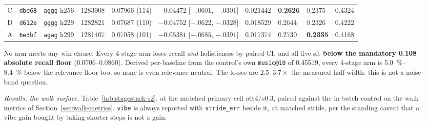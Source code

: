 \documentclass[11pt]{article}
\newcommand{\best}[1]{\textbf{#1}}
\begin{document}
\begin{table}[ht]
{\begin{tabular}{lllrllllll}
    C & \texttt{dbe68} & \texttt{aggg} h256 & \num{1283008} & 0.07966 (114) & $-0.04472$ [$-.0601$, $-.0301$] & 0.021442 & \best{0.2626} & 0.2375 & 0.4324 \\
    D & \texttt{d612e} & \texttt{gggg} h229 & \num{1282821} & 0.07687 (110) & $-0.04752$ [$-.0622$, $-.0328$] & 0.018529 & 0.2644 & 0.2326 & 0.4222 \\
    A & \texttt{6e3bf} & \texttt{agag} h299 & \num{1281407} & 0.07058 (101) & $-0.05381$ [$-.0685$, $-.0391$] & 0.017374 & 0.2730 & \best{0.2335} & 0.4168 \\
    \bottomrule
  \end{tabular}}
\end{table}

No arm meets any win clause. Every 4-stage arm loses recall \emph{and}
holisticness by paired CI, and all five sit \textbf{below the mandatory
\num{0.108} absolute recall floor} (\numrange{0.0706}{0.0860}). Derived
per-baseline from the control's own \texttt{music@10} of \num{0.45519}, every
4-stage arm is \SIrange{5.0}{8.4}{\percent} below the relevance floor too, so none
is even relevance-neutral. The losses are $\numrange{2.5}{3.7}\times$ the measured
half-width: this is not a noise-band question.

\emph{Results, the walk surface.} Table~\ref{tab:stagestack-s2}, at the matched
primary cell $a\num{0.4}$/$s\num{0.3}$, paired against the in-batch control on the
walk metrics of Section~\ref{sec:walk-metrics}. \texttt{vibe} is always reported with
\texttt{stride\_err} beside it, at matched stride, per the standing caveat that a
vibe gain bought by taking shorter steps is not a gain.
\end{document}
